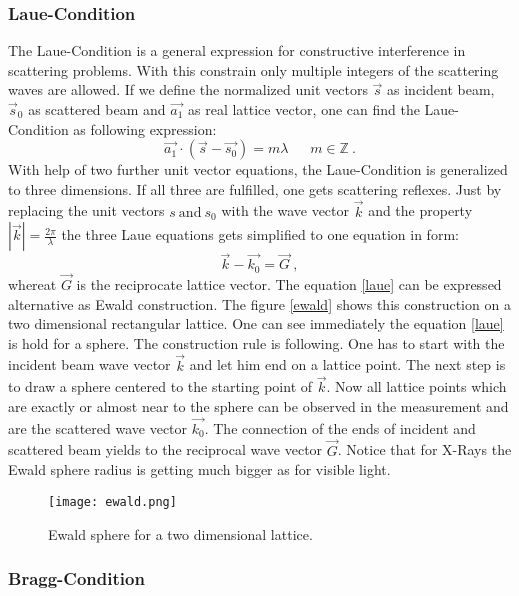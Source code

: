 	\subsubsection{Laue-Condition}
	The Laue-Condition is a general expression for constructive interference in scattering problems. With this constrain only multiple integers of the scattering waves are allowed. If we define the normalized unit vectors $\vec s$ as incident beam, $\vec s_0$ as scattered beam and $\vec {a_1}$ as real lattice vector, one can find the Laue-Condition as following expression:
	\begin{equation}
		\vec{a_1} \cdot (\vec s - \vec{s_0})=m \lambda ~~~~~~~ m\in \mathbb{Z}~\mathrm{.}
	\end{equation}
	With help of two further unit vector equations, the Laue-Condition is generalized to three dimensions. If all three are fulfilled, one gets scattering reflexes. Just by replacing the unit vectors $s~\mathrm{and}~s_0$ with the wave vector $\vec k$ and the property $|\vec k|=\frac{2\pi}{\lambda}$ the three Laue equations gets simplified to one equation in form:
	\begin{equation}
		\vec k - \vec {k_0}=\vec G ~\mathrm{,}
		\label{laue}
	\end{equation}
	whereat $\vec G$ is the reciprocate lattice vector. The equation \ref{laue} can be expressed alternative as Ewald construction. The figure \ref{ewald} shows this construction on a two dimensional rectangular lattice. One can see immediately the equation \ref{laue} is hold for a sphere. The construction rule is following. One has to start with the incident beam wave vector $\vec k$ and let him end on a lattice point. The next step is to draw a sphere centered to the starting point of $\vec{k}$. Now all lattice points which are exactly or almost near to the sphere can be observed in the measurement and are the scattered wave vector $\vec {k_0}$. The connection of the ends of incident and scattered beam yields to the reciprocal wave vector $\vec G$. Notice that for X-Rays the Ewald sphere radius is getting much bigger as for visible light.
	\begin{figure}[h]
		\centering
		\texttt{[image: ewald.png]}
		\caption[Ewald sphere for a two dimensional lattice]{Ewald sphere for a two dimensional lattice. \cite{Kop}}
	\end{figure}
	
	\subsubsection{Bragg-Condition}
	
